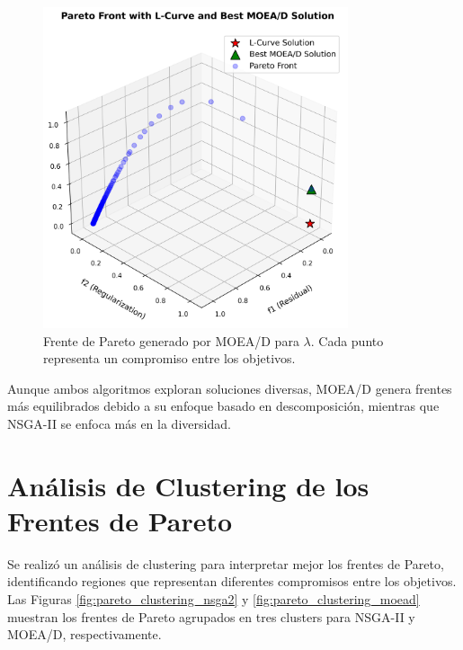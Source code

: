 \begin{figure}[H]
    \centering
    \includegraphics[width=0.8\textwidth]{Images/pareto_front_moead.png}
    \caption{Frente de Pareto generado por MOEA/D para \( \lambda \). Cada punto representa un compromiso entre los objetivos.}
    \label{fig:pareto_front_moead}
\end{figure}

Aunque ambos algoritmos exploran soluciones diversas, MOEA/D genera frentes más equilibrados debido a su enfoque basado en descomposición, mientras que NSGA-II se enfoca más en la diversidad.

\section{Análisis de Clustering de los Frentes de Pareto} \label{sec:results:clustering}

Se realizó un análisis de clustering para interpretar mejor los frentes de Pareto, identificando regiones que representan diferentes compromisos entre los objetivos. Las Figuras \ref{fig:pareto_clustering_nsga2} y \ref{fig:pareto_clustering_moead} muestran los frentes de Pareto agrupados en tres clusters para NSGA-II y MOEA/D, respectivamente.

